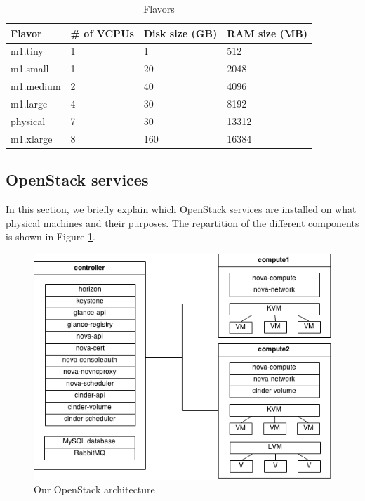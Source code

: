 \begin{table}[h]
	\centering
	\begin{tabular}{|l|l|l|l|}
		\hline
		\textbf{Flavor} & \textbf{\# of VCPUs} & \textbf{Disk size (GB)} & \textbf{RAM size (MB)}\\
		\hline
		m1.tiny & 1 & 1 & 512 \\
		m1.small & 1 & 20 & 2048 \\
		m1.medium & 2 & 40 & 4096 \\
		m1.large & 4 & 30 & 8192 \\
		physical & 7 & 30 & 13312 \\
		m1.xlarge & 8 & 160 & 16384 \\
		\hline
	\end{tabular}
	\caption{Flavors}
	\label{table:flavors_list_2}
\end{table}



\subsection{OpenStack services} %
In this section, we briefly explain which OpenStack services are installed on what physical machines and their purposes.
The repartition of the different components is shown in Figure \ref{fig:os_arch}.

\begin{figure}[h]
	\centering
	\includegraphics[scale=0.6]{figures/os_arch.png}
	\caption{Our OpenStack architecture}
	\label{fig:os_arch}
\end{figure}

